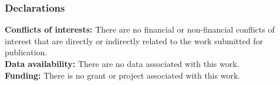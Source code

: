 \documentclass{amsart}
\begin{document}
 
% 
%
%
%  
%   
% 


\subsubsection*{Declarations}


{\bf Conflicts of interests:}
There are no financial or non-financial conflicts of interest that are directly or indirectly related to the work submitted for publication.\\

{\bf Data availability:} There are no data associated with this work.\\

{\bf Funding:} There is no grant or project associated with this work.

\small 
\end{document}
